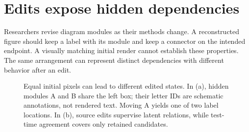 \documentclass{article}
\begin{document}
\printAffiliationsAndNotice{}
\begin{abstract}
Scientific diagrams can look identical while encoding different attachments. Moving a module then reveals which labels and connectors depend on it. We formulate raster-to-authoring recovery from observed edit responses, without annotated relation edges. A small scorer assigns probabilities to candidate attachments; a deterministic executor maps each attachment to an edited state. We define a marginal-likelihood objective using author-observed before/after edits. At inference, the system executes a requested edit only when retained candidates predict compatible responses, or it asks for clarification. We prove that initial pixels need not identify an edit response and that supplied acyclic rules preserve unaffected object states. This pre-experimental draft specifies the method and the tests needed to establish its value. It reports no trained model or reconstruction benchmark result.
\end{abstract}

\section{Edits expose hidden dependencies}
Researchers revise diagram modules as their methods change. A reconstructed figure should keep a label with its module and keep a connector on the intended endpoint. A visually matching initial render cannot establish these properties. The same arrangement can represent distinct dependencies with different behavior after an edit.

\begin{figure}[t]
\centering

\caption{Equal initial pixels can lead to different edited states. In (a), hidden modules A and B share the left box; their letter IDs are schematic annotations, not rendered text. Moving A yields one of two label locations. In (b), source edits supervise latent relations, while test-time agreement covers only retained candidates.}
\label{fig:response}
\end{figure}
\end{document}
